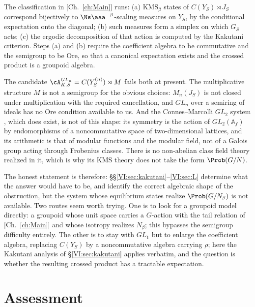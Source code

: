 \begin{remark}\label{VI:rem:gap}
The classification in [Ch.~\ref{ch:Main}] runs: (a) $\mathrm{KMS}_\beta$ states of
$C(Y_S)\rtimes J_S$ correspond bijectively to $\Ns\aaa^{-\beta}$-scaling measures on $Y_S$,
by the conditional expectation onto the diagonal; (b) such measures form a simplex on which
$G_S$ acts; (c) the ergodic decomposition of that action is computed by the Kakutani
criterion. Steps (a) and (b) require the coefficient algebra to be commutative and the
semigroup to be Ore, so that a canonical expectation exists and the crossed product is a
groupoid algebra.

The candidate $\cA^{GL_n}_{K,S}=C(Y^{(n)}_S)\rtimes M$ fails both at present. The
multiplicative structure $M$ is not a semigroup for the obvious choices: $M_n(J_S)$ is not
closed under multiplication with the required cancellation, and $GL_n$ over a semiring of
ideals has no Ore condition available to us. And the Connes--Marcolli $GL_2$ system \cite{ConnesMarcolli2006}, which
does exist, is not of this shape: its symmetry is the action of $GL_2(\mathbb A_f)$ by
endomorphisms of a noncommutative space of two-dimensional lattices, and its arithmetic is
that of modular functions and the modular field, not of a Galois group acting through
Frobenius classes. There is no non-abelian class field theory realized in it, which is why
its $\mathrm{KMS}$ theory does not take the form $\Prob(G/N)$.

The honest statement is therefore: \S\S\ref{VI:sec:kakutani}--\ref{VI:sec:L} determine what the
answer would have to be, and identify the correct algebraic shape of the obstruction, but the
system whose equilibrium states realize $\Prob(G/N_\beta)$ is not available. Two routes seem
worth trying. One is to look for a groupoid model directly: a groupoid whose unit space
carries a $G$-action with the tail relation of [Ch.~\ref{ch:Main}] and whose isotropy realizes
$N_\beta$; this bypasses the semigroup difficulty entirely. The other is to stay with $GL_1$
but to enlarge the coefficient algebra, replacing $C(Y_S)$ by a noncommutative algebra
carrying $\rho$; here the Kakutani analysis of \S\ref{VI:sec:kakutani} applies verbatim, and the
question is whether the resulting crossed product has a tractable expectation.
\end{remark}

\section{Assessment}

